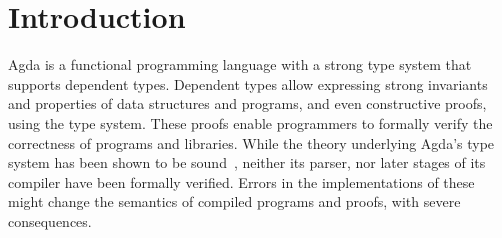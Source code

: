 \chapter{Introduction}


%

	Agda is a functional programming language with a strong type system that
	supports dependent types. Dependent types allow expressing strong
	invariants and properties of data structures and programs, and even
	constructive proofs, using the type system. These proofs enable programmers
	to formally verify the correctness of programs and libraries. While the
	theory underlying Agda's type system has been shown to be
	sound~\cite{martin84}, neither its parser, nor later stages of its compiler
	have been formally verified. Errors in the implementations of these might
	change the semantics of compiled programs and proofs, with severe
	consequences.

